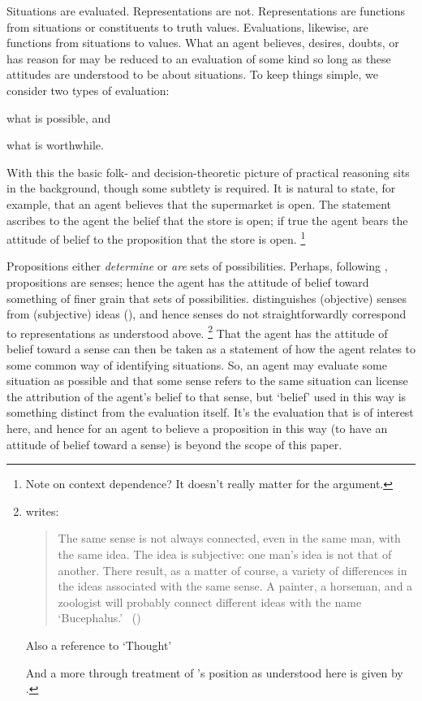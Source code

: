 \documentclass[10pt]{article}
\begin{document}
Situations are evaluated.
Representations are not.
Representations are functions from situations or constituents to truth values.
Evaluations, likewise, are functions from situations to values.
What an agent believes, desires, doubts, or has reason for may be reduced to an evaluation of some kind so long as these attitudes are understood to be about situations.
To keep things simple, we consider two types of evaluation:
\begin{enumerate*}[label=(\roman*)]
\item what is possible, and
\item what is worthwhile.
\end{enumerate*}

With this the basic folk- and decision-theoretic picture of practical reasoning sits in the background, though some subtlety is required.
It is natural to state, for example, that an agent believes that the supermarket is open.
The statement ascribes to the agent the belief that the store is open; if true the agent bears the attitude of belief to the proposition that the store is open.\nolinebreak
\footnote{Note on context dependence? It doesn't really matter for the argument.}


Propositions either \emph{determine} or \emph{are} sets of possibilities.
Perhaps, following \citeauthor{Frege:1948aa}, propositions are senses; hence the agent has the attitude of belief toward something of finer grain that sets of possibilities.
\citeauthor{Frege:1948aa} distinguishes (objective) senses from (subjective) ideas (\citeyear[39--40]{Frege:1948aa}), and hence senses do not straightforwardly correspond to representations as understood above.\nolinebreak
\footnote{
  \citeauthor{Frege:1948aa} writes:
  \begin{quote}
    The same sense is not always connected, even in the same man, with the same idea.
    The idea is subjective: one man's idea is not that of another.
    There result, as a matter of course, a variety of differences in the ideas associated with the same sense.
    A painter, a horseman, and a zoologist will probably connect different ideas with the name `Bucephalus.'\nolinebreak
    \mbox{ }\hfill(\citeyear[39]{Frege:1948aa})
  \end{quote}
  {\color{red} Also a reference to `Thought'}
  
  And a more through treatment of \citeauthor{Frege:1948aa}'s position as understood here is given by \textcite{May:2006aa}.
}
That the agent has the attitude of belief toward a sense can then be taken as a statement of how the agent relates to some common way of identifying situations.
So, an agent may evaluate some situation as possible and that some sense refers to the same situation can license the attribution of the agent's belief to that sense, but `belief' used in this way is something distinct from the evaluation itself.
It's the evaluation that is of interest here, and hence for an agent to believe a proposition in this way (to have an attitude of belief toward a sense) is beyond the scope of this paper.
\end{document}
